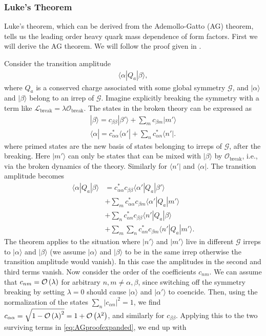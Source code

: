 \subsubsection{Luke's Theorem}

Luke's theorem, which can be derived from the Ademollo-Gatto (AG) theorem, tells us the leading order heavy quark mass dependence of form factors. First we will derive the AG theorem. We will follow the proof given in \cite{Lebed:1991sq}.

Consider the transition amplitude
\begin{align}
  \langle \alpha | Q_a | \beta \rangle,
\end{align}
where $Q_a$ is a conserved charge associated with some global symmetry $\mathcal{G}$, and $|\alpha\rangle$ and $|\beta\rangle$ belong to an irrep of $\mathcal{G}$. Imagine explicitly breaking the symmetry with a term like $\mathscr{L}_{\text{break}} = \lambda \mathcal{O}_{\text{break}}$. The states in the broken theory can be expressed as
\begin{align}
  |\beta \rangle = c_{\beta\beta} | \beta' \rangle + \sum_{m} c_{\beta m} | m' \rangle \\
  \langle \alpha | = c^*_{\alpha\alpha} \langle \alpha' | + \sum_{n} c^*_{\alpha n} \langle n' |.
\end{align}
where primed states are the new basis of states belonging to irreps of $\mathcal{G}$, after the breaking. Here $|m'\rangle$ can only be states that can be mixed with $| \beta \rangle$ by $\mathcal{O}_{\text{break}}$, i.e., via the broken dynamics of the theory. Similarly for $\langle n' |$ and $\langle \alpha |$. The transition amplitude becomes
\begin{align}
  \nonumber
  \langle \alpha | Q_a | \beta \rangle
  &= c_{\alpha\alpha}^* c_{\beta\beta} \langle \alpha' | Q_a | \beta' \rangle \\
  \nonumber
  &+ \sum_m c_{\alpha\alpha}^* c_{\beta m} \langle \alpha' | Q_a | m' \rangle \\
  \nonumber
  &+ \sum_n c_{\alpha n}^* c_{\beta \beta} \langle n' | Q_a | \beta \rangle \\
  &+ \sum_m\sum_n c_{\alpha n}^* c_{\beta m} \langle n' | Q_a | m' \rangle.
  \label{eq:AGproofexpanded}
\end{align}
The theorem applies to the situation where $|n'\rangle$ and $|m'\rangle$ live in different $\mathcal{G}$ irreps to $|\alpha\rangle$ and $|\beta \rangle$ (we assume $|\alpha\rangle$ and $|\beta \rangle$ to be in the same irrep otherwise the transition amplitude would vanish). In this case the amplitudes in the second and third terms vanish. Now consider the order of the coefficients $c_{nm}$. We can assume that $c_{nm} = \mathcal{O}\left( \lambda \right)$ for arbitrary $n,m \neq \alpha,\beta$, since switching off the symmetry breaking by setting $\lambda=0$ should cause $|\alpha\rangle $ and $|\alpha'\rangle$ to coencide. Then, using the normalization of the states $\sum_{n} |c_{\alpha n} |^2 = 1$, we find $c_{\alpha\alpha} = \sqrt{1 - \mathcal{O}\left( \lambda \right)^2} = 1 + \mathcal{O}\left( \lambda^2 \right)$, and similarly for $c_{\beta\beta}$. Applying this to the two surviving terms in \eqref{eq:AGproofexpanded}, we end up with

